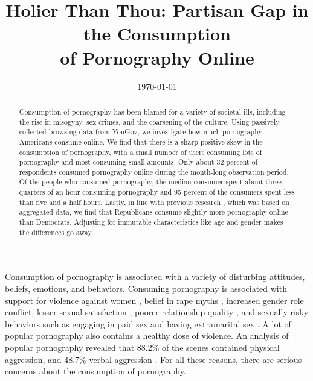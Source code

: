 \documentclass[12pt, letterpaper]{article}
\title{Holier Than Thou: Partisan Gap in the Consumption\\ of Pornography Online}%
\date{\today}
\begin{document}
\maketitle

\thispagestyle{empty}
\begin{abstract}
\noindent Consumption of pornography has been blamed for a variety of societal ills, including the rise in misogyny, sex crimes, and the coarsening of the culture. Using passively collected browsing data from YouGov, we investigate how much pornography Americans consume online. We find that there is a sharp positive skew in the consumption of pornography, with a small number of users consuming lots of pornography and most consuming small amounts. Only about 32 percent of respondents consumed pornography online during the month-long observation period. Of the people who consumed pornography, the median consumer spent about three-quarters of an hour consuming pornography and 95 percent of the consumers spent less than five and a half hours. Lastly, in line with previous research \citep{macinnis2015american, edelman2009markets}, which was based on aggregated data, we find that Republicans consume slightly more pornography online than Democrats. Adjusting for immutable characteristics like age and gender makes the differences go away.
\end{abstract} 
\clearpage
\setcounter{page}{1}
\doublespace

Consumption of pornography is associated with a variety of disturbing attitudes, beliefs, emotions, and behaviors. Consuming pornography is associated with support for violence against women \citep{hald2010pornography, malamuth2012pornography, donnerstein1984pornography}, belief in rape myths \citep{foubert2011pornography}, increased gender role conflict, lesser sexual satisfaction \citep{szymanski2014psychological, stewart2012young}, poorer relationship quality \citep{szymanski2014psychological, szymanski2015male}, and sexually risky behaviors such as engaging in paid sex and having extramarital sex \citep{wright2012internet}. A lot of popular pornography also contains a healthy dose of violence. An analysis of popular pornography revealed that 88.2\% of the scenes contained physical aggression, and 48.7\% verbal aggression \citep{bridges2010aggression}. For all these reasons, there are serious concerns about the consumption of pornography.
\end{document}

